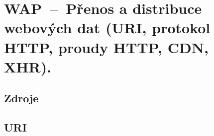 

\graphicspath{{wap/prenos_a_distribuce_webovych_dat/figures}}


\chapter{WAP~--~Přenos a distribuce webových dat (URI, protokol HTTP, proudy HTTP, CDN, XHR).}


\section{Zdroje}

\begin{compactitem}
    \item {}
    \item {}
    \item {}
    \item {}
\end{compactitem}


\section{URI}

